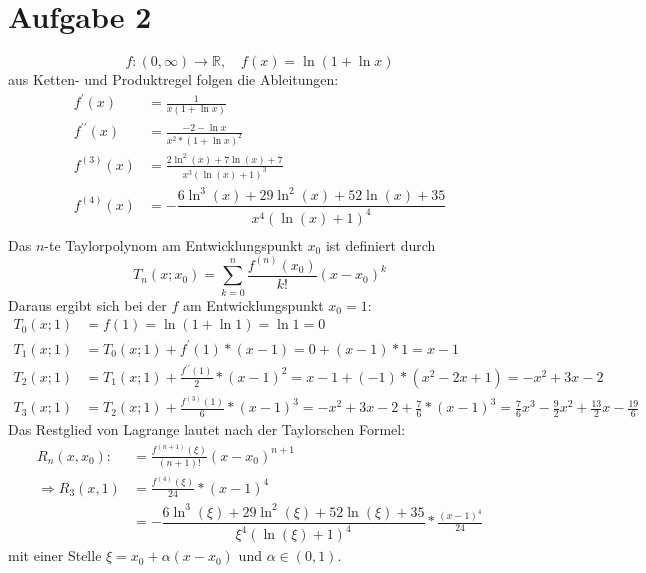 \documentclass[a4paper]{article}
\begin{document}
\section*{Aufgabe 2}
\[ f: (0,\infty) \rightarrow \mathbb{R}, \quad f(x) = \ln(1 + \ln x) \]
aus Ketten- und Produktregel folgen die Ableitungen:
\begin{align*}
	f^\prime (x) &=
	\frac{1}{x (1+\ln x)} \\
	f^{\prime\prime} (x) &=
	\frac{-2 - \ln x}{x^2 * (1+\ln x)^2}\\
	f^{(3)} (x) &=
	\frac{2\ln^2\left(x\right)+7\ln\left(x\right)+7}{x^3\left(\ln\left(x\right)+1\right)^3} \\
	f^{(4)} (x) &=
	-\dfrac{6\ln^3\left(x\right)+29\ln^2\left(x\right)+52\ln\left(x\right)+35}{x^4\left(\ln\left(x\right)+1\right)^4} \\
\end{align*}
Das $n$-te Taylorpolynom am Entwicklungspunkt $x_0$ ist definiert durch
\[
	T_n(x;x_0) = \sum_{k=0}^n \frac{f^{(n)}(x_0)}{k!} (x-x_0)^k
	\]
Daraus ergibt sich bei der $f$ am Entwicklungspunkt $x_0 = 1$:
\begin{align*}
	T_0(x;1) &=
	f(1) = \ln (1 + \ln 1) = \ln 1 = 0 \\
	T_1(x;1) &=
	T_0(x;1) + f^\prime(1) * (x-1) = 0 + (x-1) * 1 = x - 1 \\
	T_2(x;1) &=
	T_1(x;1) + \frac{f^{\prime\prime}(1)}{2} * (x-1)^2 = x - 1 + (-1) * (x^2 - 2x + 1) = -x^2 + 3x -2 \\
	T_3(x;1) &=
	T_2(x;1) + \frac{f^{(3)}(1)}{6} * (x-1)^3 = -x^2 + 3x -2 + \frac{7}{6} * (x-1)^3 
	= \frac{7}{6} x^3 - \frac{9}{2} x^2 + \frac{13}{2} x - \frac{19}{6}
\end{align*}
Das Restglied von Lagrange lautet nach der Taylorschen Formel:
\begin{align*}
	R_n(x,x_0) :	&= \frac{f^{(n+1)}(\xi)}{(n + 1)!} (x - x_0)^{n+1} \\
	\Rightarrow R_3(x,1) &= \frac{f^{(4)}(\xi)}{24} * (x-1)^4  \\
	&= -\dfrac{6\ln^3\left(\xi\right)+29\ln^2\left(\xi\right)+52\ln\left(\xi\right)+35}{\xi^4\left(\ln\left(\xi\right)+1\right)^4} * \frac{(x-1)^4}{24}
\end{align*}
mit einer Stelle $\xi = x_0 + \alpha(x-x_0)$ und $\alpha \in (0,1)$.
\end{document}
